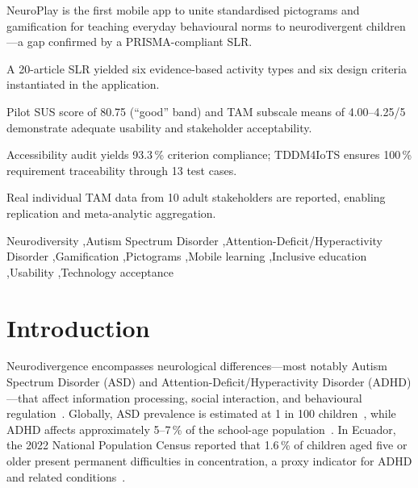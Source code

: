 \documentclass[preprint,12pt]{elsarticle}
\begin{document}
\begin{frontmatter}
\begin{abstract}
        \end{abstract}
        \begin{highlights}
            \item NeuroPlay is the first mobile app to unite standardised pictograms and gamification for teaching everyday behavioural norms to neurodivergent children---a gap confirmed by a PRISMA-compliant SLR.
            \item A 20-article SLR yielded six evidence-based activity types and six design criteria instantiated in the application.
            \item Pilot SUS score of 80.75 (``good'' band) and TAM subscale means of 4.00--4.25/5 demonstrate adequate usability and stakeholder acceptability.
            \item Accessibility audit yields 93.3\,\% criterion compliance; TDDM4IoTS ensures 100\,\% requirement traceability through 13 test cases.
            \item Real individual TAM data from 10 adult stakeholders are reported, enabling replication and meta-analytic aggregation.
        \end{highlights}
        \begin{keyword}
            Neurodiversity \sep Autism Spectrum Disorder \sep Attention-Deficit/Hyperactivity Disorder \sep Gamification \sep Pictograms \sep Mobile learning \sep Inclusive education \sep Usability \sep Technology acceptance
        \end{keyword}
    \end{frontmatter}
    \section{Introduction}
    \label{sec:intro}
        Neurodivergence encompasses neurological differences---most notably Autism Spectrum Disorder (ASD) and Attention-Deficit/Hyperactivity Disorder (ADHD)---that affect information processing, social interaction, and behavioural regulation~\cite{armstrong2010neurodiversity}. Globally, ASD prevalence is estimated at 1 in 100 children~\cite{WHO2023}, while ADHD affects approximately 5--7\,\% of the school-age population~\cite{polanczyk2015adhd}. In Ecuador, the 2022 National Population Census reported that 1.6\,\% of children aged five or older present permanent difficulties in concentration, a proxy indicator for ADHD and related conditions~\cite{INEC2022}.
        
\end{document}
